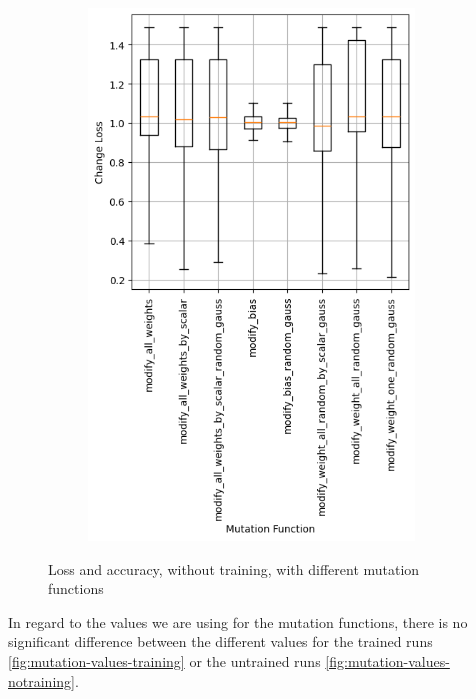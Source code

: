 \begin{figure}
\begin{subfigure}{0.5\textwidth}
        \includegraphics[width=0.95\textwidth]{plots/Mutatation_NotTrained_loss.png}
    \end{subfigure}
    \caption{Loss and accuracy, without training, with different mutation functions}
    \label{fig:mutation-functions-notraining}
\end{figure}
In regard to the values we are using for the mutation functions, there is no significant difference between the different values for the trained runs \ref{fig:mutation-values-training} or the untrained runs \ref{fig:mutation-values-notraining}.
